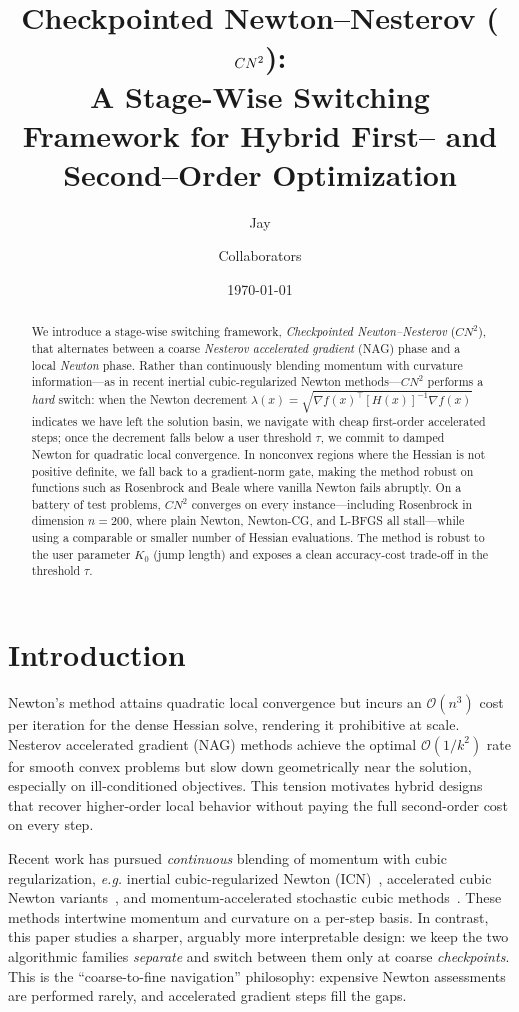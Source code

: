 \documentclass[11pt]{article}
\title{\textbf{Checkpointed Newton--Nesterov ($\cn$):\\ A Stage-Wise Switching Framework for
Hybrid First-- and Second--Order Optimization}}
\author{Jay \; \and Collaborators}
\date{\today}
\newcommand{\lam}{\lambda}
\newcommand{\grad}{\nabla}
\newcommand{\cn}{CN^2}
\begin{document}
\maketitle

\begin{abstract}
We introduce a stage-wise switching framework, \emph{Checkpointed Newton--Nesterov} ($\cn$),
that alternates between a coarse \emph{Nesterov accelerated gradient} (NAG) phase and a
local \emph{Newton} phase. Rather than continuously blending momentum with curvature
information---as in recent inertial cubic-regularized Newton methods---$\cn$ performs a
\emph{hard} switch: when the Newton decrement $\lam(x)=\sqrt{\grad f(x)^{\top}
[H(x)]^{-1}\grad f(x)}$ indicates we have left the solution basin, we navigate with cheap
first-order accelerated steps; once the decrement falls below a user threshold $\tau$, we
commit to damped Newton for quadratic local convergence. In nonconvex regions where the
Hessian is not positive definite, we fall back to a gradient-norm gate, making the method
robust on functions such as Rosenbrock and Beale where vanilla Newton fails abruptly. On a
battery of test problems, $\cn$ converges on every instance---including Rosenbrock in
dimension $n=200$, where plain Newton, Newton-CG, and L-BFGS all stall---while using a
comparable or smaller number of Hessian evaluations. The method is robust to the user
parameter $K_0$ (jump length) and exposes a clean accuracy-cost trade-off in the threshold
$\tau$.
\end{abstract}

\section{Introduction}
\label{sec:intro}

Newton's method attains quadratic local convergence but incurs an $\mathcal{O}(n^3)$ cost
per iteration for the dense Hessian solve, rendering it prohibitive at scale. Nesterov
accelerated gradient (NAG) methods achieve the optimal $\mathcal{O}(1/k^2)$ rate for
smooth convex problems but slow down geometrically near the solution, especially on
ill-conditioned objectives. This tension motivates hybrid designs that recover higher-order
local behavior without paying the full second-order cost on every step.

Recent work has pursued \emph{continuous} blending of momentum with cubic regularization,
\emph{e.g.} inertial cubic-regularized Newton (ICN)~\cite{icn2026}, accelerated cubic
Newton variants~\cite{optami2025}, and momentum-accelerated stochastic cubic
methods~\cite{aistats2025}. These methods intertwine momentum and curvature on a per-step
basis. In contrast, this paper studies a sharper, arguably more interpretable design: we
keep the two algorithmic families \emph{separate} and switch between them only at coarse
\emph{checkpoints}. This is the ``coarse-to-fine navigation'' philosophy: expensive
Newton assessments are performed rarely, and accelerated gradient steps fill the gaps.
\end{document}
